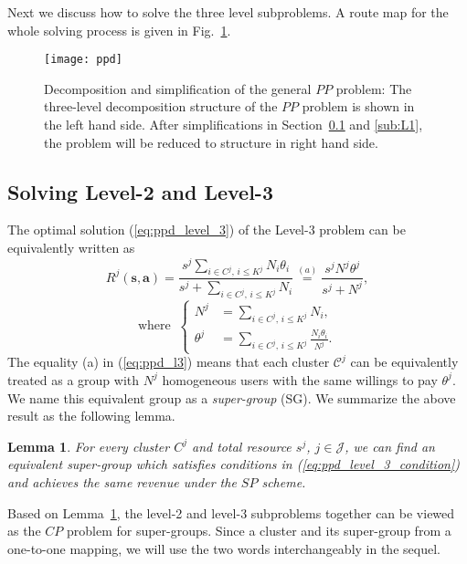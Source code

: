 \documentclass[twocolumn,10pt,twosided]{IEEEtran}
\newtheorem{lemma}{Lemma}
\begin{document}
Next we discuss how to solve the three level subproblems. A route map for the whole solving process is given in Fig.~\ref{fig:PPD}.

\begin{figure}[ht]
\centering
\texttt{[image: ppd]}
\caption{Decomposition and simplification of the general $PP$ problem: The three-level decomposition structure of the $PP$ problem is shown in the left hand side. After simplifications in Section~\ref{sub_L2L3} and \ref{sub:L1}, the problem will be reduced to structure in right hand side.}
\label{fig:PPD}
\end{figure}


\subsection{Solving Level-2 and Level-3}
\label{sub_L2L3}
The optimal solution  (\ref{eq:ppd_level_3}) of the Level-3 problem  can be equivalently written as
\begin{equation}
\label{eq:ppd_l3}
R^j(\boldsymbol{s},\boldsymbol{a})=\frac{s^j \sum_{i\in C^j, \,i\le K^j}N_i\theta_i}{s^j +\sum_{i\in C^j, \,i\le K^j}N_i}\overset{(a)}{=} \frac{s^j N^j\theta^j}{s^j +N^j},
\end{equation}
\begin{equation}
\label{eq:ppd_level_3_condition}
\text{where}\;\;
\begin{cases}
N^j&={\sum_{i\in C^j, \,i\le K^j}N_i},\\
\theta^j&=\sum_{i\in C^j, \,i\le K^j}\frac{N_i \theta_i}{N^j}.
\end{cases}
\end{equation}
The equality (a) in (\ref{eq:ppd_l3}) means that each cluster  $\mathcal{C}^j$ can be equivalently treated as a group with $N^j$ homogeneous users with the same willings to pay $\theta^j$. We name this equivalent group as a \emph{super-group} (SG). We summarize the above result as the following lemma.

\begin{lemma}
\label{le:sp}
For every cluster $C^j$ and total resource $s^j$, $j\in\mathcal{J}$, we can find an equivalent super-group which satisfies conditions in (\ref{eq:ppd_level_3_condition}) and achieves the same revenue under the $SP$ scheme.
\end{lemma}

Based on Lemma~\ref{le:sp}, the level-2 and level-3 subproblems together can be viewed as the $CP$ problem for super-groups. Since a cluster and its super-group from a one-to-one mapping, we will use the two words interchangeably in the sequel.
\end{document}
